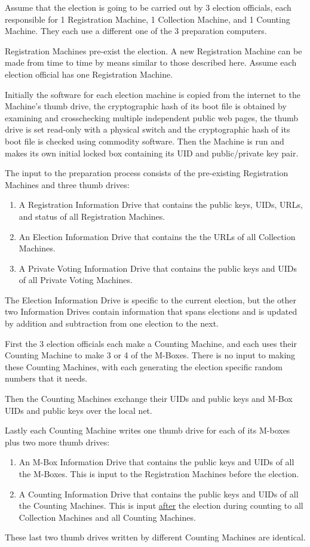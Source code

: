 \documentclass[12pt]{article}
\begin{document}
Assume that the election is going to be carried out by 3 election
officials, each responsible for 1 Registration Machine, 1 Collection
Machine, and 1 Counting Machine.  They each use a different one of
the 3 preparation computers.

Registration Machines pre-exist the election.
A new Registration Machine can be made from time to time
by means similar to those described here.  Assume each election
official has one Registration Machine.

Initially the software for each election machine
is copied from the internet to the Machine's thumb drive,
the cryptographic hash of its boot file is obtained by examining
and crosschecking multiple independent public web pages, the thumb
drive is set read-only with a physical switch and the cryptographic
hash of its boot file is checked using commodity software.
Then the Machine is run and makes its own initial locked box
containing its UID and public/private key pair.

The input to the preparation process consists of the pre-existing
Registration Machines and three thumb drives:
\begin{enumerate}
\item A Registration Information Drive that contains the
public keys, UIDs, URLs, and status of all Registration
Machines.
\item An Election Information Drive that contains the
the URLs of all Collection Machines.
\item A Private Voting Information Drive that contains the
public keys and UIDs of all Private Voting Machines.
\end{enumerate}
The Election Information Drive is specific to the current election,
but the other two Information Drives contain information that
spans elections and is updated by addition and subtraction
from one election to the next.

First the 3 election officials each make a Counting Machine, and
each uses their Counting Machine to make 3 or 4 of the M-Boxes.  There
is no input to making these Counting Machines, with
each generating the election specific random numbers that it needs.

Then the Counting Machines exchange their UIDs and public keys and M-Box
UIDs and public keys over the local net.

Lastly each Counting Machine
writes one thumb drive for each of its M-boxes plus two more thumb drives:
\begin{enumerate}
\item An M-Box Information Drive that contains the public keys and
UIDs of all the M-Boxes.  This is input to the Registration Machines
before the election.
\item A Counting Information Drive that contains the public keys and
UIDs of all the Counting Machines.
This is input \underline{after} the election during
counting to all Collection Machines and all Counting Machines.
\end{enumerate}
These last two thumb drives written by different Counting Machines
are identical.
\end{document}
